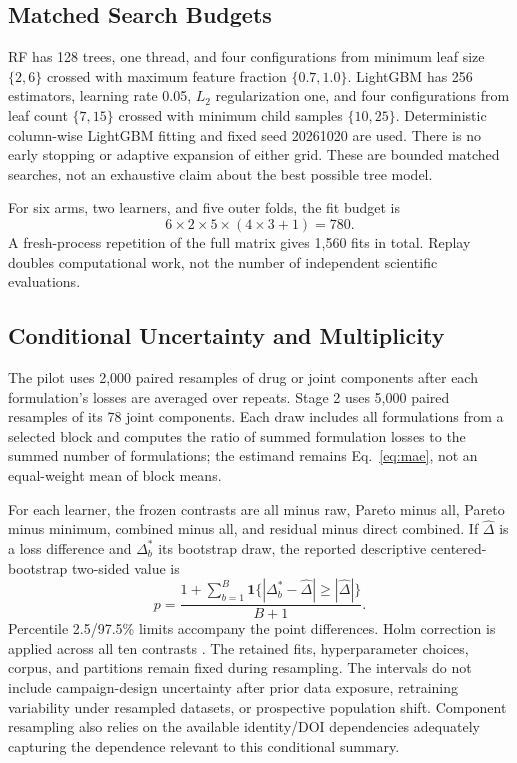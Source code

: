 \documentclass[conference,letterpaper]{IEEEtran}
\begin{document}
\subsection{Matched Search Budgets}
RF \cite{breiman2001} has 128 trees, one thread, and four configurations from minimum leaf size $\{2,6\}$ crossed with maximum feature fraction $\{0.7,1.0\}$. LightGBM \cite{ke2017} has 256 estimators, learning rate 0.05, $L_2$ regularization one, and four configurations from leaf count $\{7,15\}$ crossed with minimum child samples $\{10,25\}$. Deterministic column-wise LightGBM fitting and fixed seed 20261020 are used. There is no early stopping or adaptive expansion of either grid. These are bounded matched searches, not an exhaustive claim about the best possible tree model.

For six arms, two learners, and five outer folds, the fit budget is
\begin{equation}
 6\times2\times5\times(4\times3+1)=780.
\end{equation}
A fresh-process repetition of the full matrix gives 1,560 fits in total. Replay doubles computational work, not the number of independent scientific evaluations.

\subsection{Conditional Uncertainty and Multiplicity}
The pilot uses 2,000 paired resamples of drug or joint components after each formulation's losses are averaged over repeats. Stage 2 uses 5,000 paired resamples of its 78 joint components. Each draw includes all formulations from a selected block and computes the ratio of summed formulation losses to the summed number of formulations; the estimand remains Eq.~\eqref{eq:mae}, not an equal-weight mean of block means.

For each learner, the frozen contrasts are all minus raw, Pareto minus all, Pareto minus minimum, combined minus all, and residual minus direct combined. If $\hat\Delta$ is a loss difference and $\Delta_b^*$ its bootstrap draw, the reported descriptive centered-bootstrap two-sided value is
\begin{equation}
 p=\frac{1+\sum_{b=1}^{B}\mathbf{1}\{ |\Delta_b^*-\hat\Delta|\geq|\hat\Delta|\}}{B+1}.
\end{equation}
Percentile 2.5/97.5\% limits accompany the point differences. Holm correction is applied across all ten contrasts \cite{holm1979}. The retained fits, hyperparameter choices, corpus, and partitions remain fixed during resampling. The intervals do not include campaign-design uncertainty after prior data exposure, retraining variability under resampled datasets, or prospective population shift. Component resampling also relies on the available identity/DOI dependencies adequately capturing the dependence relevant to this conditional summary.
\end{document}
